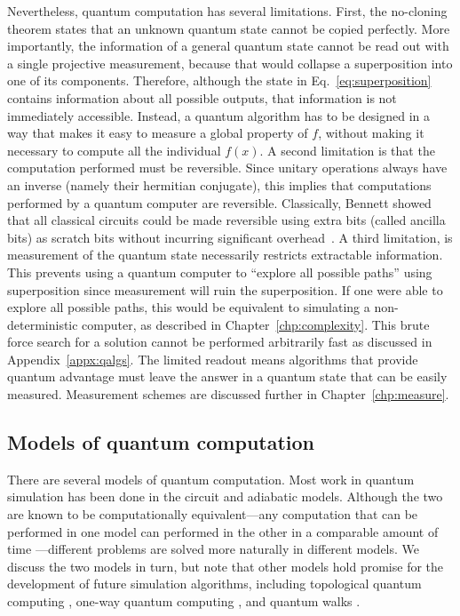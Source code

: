 \documentclass[11pt,oneside,final]{huthesis}%
\begin{document}
Nevertheless, quantum computation has several limitations. First, the
no-cloning theorem \cite{Nielsen00, Kaye07} states that an unknown quantum
state cannot be copied perfectly. More importantly, the information of a general
quantum state cannot be read out with a single projective measurement, because
that would collapse a superposition into one of its components. Therefore, although
the state in Eq.~\eqref{eq:superposition} contains information about all possible
outputs, that information is not immediately accessible. Instead, a quantum
algorithm has to be designed in a way that makes it easy to measure a global
property of $f$, without making it necessary to compute all the individual
$f(x)$. 
A second limitation is that the computation performed must be reversible. Since unitary operations always have an inverse (namely their hermitian conjugate), this implies that computations performed by a quantum computer are reversible.  Classically, Bennett showed that all classical circuits could be made reversible using extra bits  (called ancilla bits) as scratch bits without incurring significant overhead~\cite{Bennett73}.
A third limitation, is measurement of the quantum state necessarily restricts extractable information.  This prevents using a quantum computer to ``explore all possible paths'' using superposition since measurement will ruin the superposition.  If one were able to explore all possible paths, this would be equivalent to simulating a non-deterministic computer, as described in Chapter~\ref{chp:complexity}.  This brute force search for a solution cannot be performed arbitrarily fast as discussed in Appendix~\ref{appx:qalgs}.  The limited readout means algorithms that provide quantum advantage must leave the answer in a quantum state that can be easily measured.  Measurement schemes are discussed further in Chapter~\ref{chp:measure}.

\subsection{Models of quantum computation}

There are several models of quantum computation. Most work
in quantum simulation has been done in the circuit and adiabatic models. Although
the two are known to be computationally equivalent---any computation that can be
performed in one model can performed in the other in a comparable amount of time
\cite{Aharonov07,Kempe06,Mizel07}---different problems are solved more
naturally in different models. We discuss the two models in turn, but note that
other models hold promise for the development of future simulation algorithms,
including topological quantum computing
\cite{Kitaev03,Nayak08}, one-way quantum
computing \cite{Raussendorf01,Raussendorf03},
and quantum walks \cite{Kempe03walk}.
\end{document}
